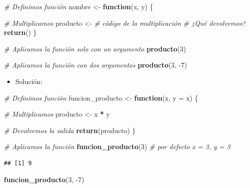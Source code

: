 \documentclass[11pt,]{book}
\newenvironment{Shaded}{\begin{snugshade}}{\end{snugshade}}
\newcommand{\CommentTok}[1]{\textcolor[rgb]{0.37,0.37,0.37}{\textit{#1}}}
\newcommand{\ControlFlowTok}[1]{\textcolor[rgb]{0.27,0.27,0.27}{\textbf{#1}}}
\newcommand{\DataTypeTok}[1]{\textcolor[rgb]{0.27,0.27,0.27}{#1}}
\newcommand{\DecValTok}[1]{\textcolor[rgb]{0.06,0.06,0.06}{#1}}
\newcommand{\KeywordTok}[1]{\textcolor[rgb]{0.27,0.27,0.27}{\textbf{#1}}}
\newcommand{\NormalTok}[1]{#1}
\newcommand{\OperatorTok}[1]{\textcolor[rgb]{0.43,0.43,0.43}{\textbf{#1}}}
\newcommand{\StringTok}[1]{\textcolor[rgb]{0.5,0.5,0.5}{#1}}
\providecommand{\tightlist}{%
  \setlength{\itemsep}{0pt}\setlength{\parskip}{0pt}}
\begin{document}
\begin{Shaded}
\begin{Highlighting}[]
\CommentTok{# Definimos función}
\NormalTok{nombre <-}\StringTok{ }\ControlFlowTok{function}\NormalTok{(x, y) \{}
  
  \CommentTok{# Multiplicamos}
\NormalTok{  producto <-}\StringTok{ }\CommentTok{# código de la multiplicación}
\StringTok{  }
\StringTok{  }\CommentTok{# ¿Qué devolvemos?}
\StringTok{  }\KeywordTok{return}\NormalTok{()}
\NormalTok{\}}

\CommentTok{# Aplicamos la función solo con un argumento}
\KeywordTok{producto}\NormalTok{(}\DecValTok{3}\NormalTok{)}

\CommentTok{# Aplicamos la función con dos argumentos}
\KeywordTok{producto}\NormalTok{(}\DecValTok{3}\NormalTok{, }\DecValTok{-7}\NormalTok{)}
\end{Highlighting}
\end{Shaded}

\begin{itemize}
\tightlist
\item
  Solución:
\end{itemize}

\begin{Shaded}
\begin{Highlighting}[]
\CommentTok{# Definimos función}
\NormalTok{funcion_producto <-}\StringTok{ }\ControlFlowTok{function}\NormalTok{(x, }\DataTypeTok{y =}\NormalTok{ x) \{}
  
  \CommentTok{# Multiplicamos}
\NormalTok{  producto <-}\StringTok{ }\NormalTok{x }\OperatorTok{*}\StringTok{ }\NormalTok{y}
  
  \CommentTok{# Devolvemos la salida}
  \KeywordTok{return}\NormalTok{(producto)}
\NormalTok{\}}

\CommentTok{# Aplicamos la función}
\KeywordTok{funcion_producto}\NormalTok{(}\DecValTok{3}\NormalTok{) }\CommentTok{# por defecto x = 3, y = 3}
\end{Highlighting}
\end{Shaded}

\begin{verbatim}
## [1] 9
\end{verbatim}

\begin{Shaded}
\begin{Highlighting}[]
\KeywordTok{funcion_producto}\NormalTok{(}\DecValTok{3}\NormalTok{, }\DecValTok{-7}\NormalTok{)}
\end{Highlighting}
\end{Shaded}
\end{document}
